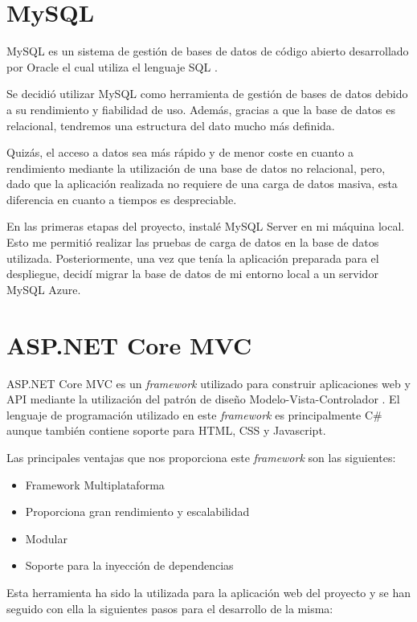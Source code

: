 \section{MySQL}
MySQL es un sistema de gestión de bases de datos de código abierto desarrollado por Oracle el cual utiliza el lenguaje SQL \cite{mysql:latex}.

Se decidió utilizar MySQL como herramienta de gestión de bases de datos debido a su rendimiento y fiabilidad de uso. Además, gracias a que la base de datos es relacional, tendremos una estructura del dato mucho más definida.

Quizás, el acceso a datos sea más rápido y de menor coste en cuanto a rendimiento mediante la utilización de una base de datos no relacional, pero, dado que la aplicación realizada no requiere de una carga de datos masiva, esta diferencia en cuanto a tiempos es despreciable.

En las primeras etapas del proyecto, instalé MySQL Server en mi máquina local. Esto me permitió realizar las pruebas de carga de datos en la base de datos utilizada. Posteriormente, una vez que tenía la aplicación preparada para el despliegue, decidí migrar la base de datos de mi entorno local a un servidor MySQL Azure.


\section{ASP.NET Core MVC}
ASP.NET Core MVC es un \textit{framework} utilizado para construir aplicaciones web y API mediante la utilización del patrón de diseño Modelo-Vista-Controlador \cite{.net:latex}. El lenguaje de programación utilizado en este \textit{framework} es principalmente C\# aunque también contiene soporte para HTML, CSS y Javascript.

Las principales ventajas que nos proporciona este \textit{framework} son las siguientes:

\begin{itemize}
    \item Framework Multiplataforma
    \item Proporciona gran rendimiento y escalabilidad
    \item Modular
    \item Soporte para la inyección de dependencias
\end{itemize}

Esta herramienta ha sido la utilizada para la aplicación web del proyecto y se han seguido con ella la siguientes pasos para el desarrollo de la misma:


